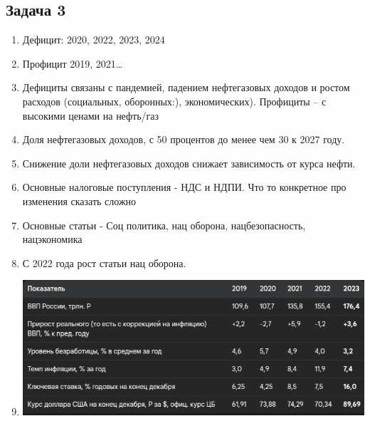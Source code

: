 \documentclass[a4paper,12pt]{article}
\begin{document}
\subsection{Задача 3}
\begin{enumerate}
    \item Дефицит: 2020, 2022, 2023, 2024
    \item Профицит  2019, 2021\dots
    \item  Дефициты связаны с пандемией, падением нефтегазовых доходов и ростом расходов (социальных, оборонных:), экономических). Профициты – с высокими ценами на нефть/газ
    \item Доля нефтегазовых доходов, с 50 процентов до менее чем 30 к 2027 году.
    \item Снижение доли нефтегазовых доходов снижает зависимость от курса нефти.
    \item Основные налоговые поступления - НДС и НДПИ. Что то конкретное про изменения сказать сложно
    \item Основные статьи - Соц политика, нац оборона, нацбезопасность, нацэкономика
    \item С 2022 года рост статьи нац оборона.
    \item \includegraphics[scale=0.45]{graphs/9.1.png}
\end{enumerate}
\end{document}

